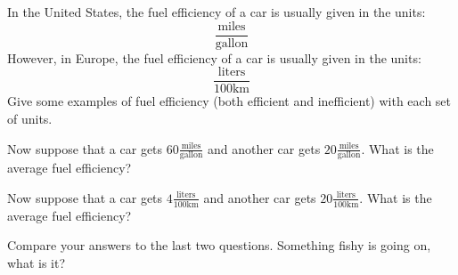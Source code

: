 \documentclass{ximera}
\begin{document}
\begin{question}
In the United States, the fuel efficiency of a car is usually given in
the units:
\[
\frac{\text{miles}}{\text{gallon}}
\]
However, in Europe, the fuel efficiency of a car is usually given in
the units:
\[
\frac{\text{liters}}{100 \mathrm{km}}
\]
Give some examples of fuel efficiency (both efficient and
inefficient) with each set of units.
\end{question}


\begin{question}
Now suppose that a car gets $60\frac{\text{miles}}{\text{gallon}}$ and
another car gets $20\frac{\text{miles}}{\text{gallon}}$. What is the
average fuel efficiency?
\end{question}


\begin{question}
Now suppose that a car gets $4\frac{\text{liters}}{100 \mathrm{km}} $
and another car gets $20\frac{\text{liters}}{100 \mathrm{km}}$. What
is the average fuel efficiency?
\end{question}


\begin{exploration}
Compare your answers to the last two questions. Something fishy is
going on, what is it?
\end{exploration}
\end{document}
